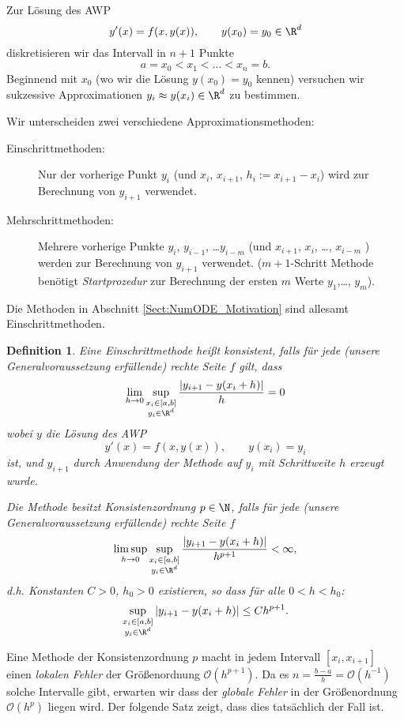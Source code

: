 \documentclass[
]{mycourse}
\theoremstyle{mythm}
\newtheorem{definition}[theorem]{Definition}
\theoremstyle{break}
\begin{document}
Zur Lösung des AWP
\[
y'(x)=f(x,y(x)), \qquad y(x_0)=y_0\in \R^d
\]
diskretisieren wir das Intervall in $n+1$ Punkte
\[
a=x_0 < x_1 < \ldots < x_n=b.
\]
Beginnend mit $x_0$ (wo wir die Lösung $y(x_0)=y_0$ kennen) versuchen wir sukzessive Approximationen $y_i\approx y(x_i)\in \R^d$ zu bestimmen.

Wir unterscheiden zwei verschiedene Approximationsmethoden:
\begin{description}
\item[Einschrittmethoden:] Nur der vorherige Punkt $y_i$ (und $x_i$, $x_{i+1}$, $h_i:=x_{i+1}-x_i$) wird zur Berechnung von $y_{i+1}$ verwendet.
\item[Mehrschrittmethoden:] Mehrere vorherige Punkte $y_i$, $y_{i-1}$, \ldots $y_{i-m}$ (und $x_{i+1}$, $x_{i}$, \ldots, $x_{i-m}$ ) 
werden zur Berechnung von $y_{i+1}$ verwendet.
($m+1$-Schritt Methode benötigt \emph{Startprozedur} zur Berechnung der ersten $m$ Werte $y_1$,\ldots, $y_m$).
\end{description}

Die Methoden in Abschnitt \ref{Sect:NumODE_Motivation} sind allesamt Einschrittmethoden. 

\begin{definition}\label{def:Konsistenz}
Eine Einschrittmethode heißt \emph{konsistent}, falls für jede (unsere Generalvoraussetzung erfüllende) rechte Seite
$f$ gilt, dass
\[
\lim_{h\to 0} \sup_{\substack{x_i\in [a,b]\\ y_i\in \R^d}} \frac{\left| y_{i+1}- y(x_i+h) \right|}{h} = 0
\]
wobei $y$ die Lösung des AWP
\[
y'(x)=f(x,y(x)), \qquad y(x_i)=y_i
\]
ist, und $y_{i+1}$ durch Anwendung der Methode auf $y_i$ mit Schrittweite $h$ erzeugt wurde.

Die Methode besitzt \emph{Konsistenzordnung} $p\in \N$, falls 
für jede (unsere Generalvoraussetzung erfüllende) rechte Seite
$f$ 
\[
\limsup_{h\to 0} \sup_{\substack{x_i\in [a,b]\\ y_i\in \R^d}} \frac{\left| y_{i+1}- y(x_i+h) \right|}{h^{p+1}}<\infty,
\]
d.h. Konstanten $C>0$, $h_0>0$ existieren, so dass für alle $0<h<h_0$:
\[
\sup_{\substack{x_i\in [a,b]\\ y_i\in \R^d}} \left| y_{i+1}- y(x_i+h) \right| \leq C h^{p+1}.
\]
\end{definition}


Eine Methode der Konsistenzordnung $p$ macht in jedem Intervall $[x_i,x_{i+1}]$ einen \emph{lokalen Fehler} 
der Größenordnung $\mathcal{O}(h^{p+1})$. Da es $n=\frac{b-a}{h}=\mathcal{O}(h^{-1})$ solche Intervalle gibt, erwarten wir dass der \emph{globale Fehler}
in der Größenordnung $\mathcal{O}(h^p)$ liegen wird. Der folgende Satz zeigt, dass dies tatsächlich der Fall ist.
\end{document}
